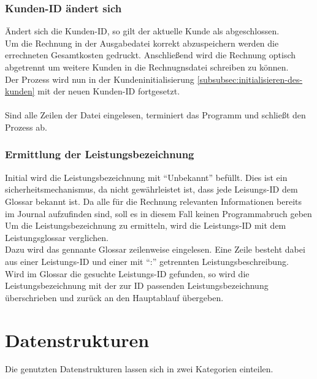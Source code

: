 \subsubsection{Kunden-ID ändert sich}\label{subsubsec:kunden-id-aendert-sich}
Ändert sich die Kunden-ID, so gilt der aktuelle Kunde als abgeschlossen.\\
Um die Rechnung in der Ausgabedatei korrekt abzuspeichern werden die errechneten Gesamtkosten gedruckt. Anschließend wird die Rechnung optisch abgetrennt um weitere Kunden in die Rechnugnsdatei schreiben zu können.\\
Der Prozess wird nun in der Kundeninitialisierung \ref{subsubsec:initialisieren-des-kunden} mit der neuen Kunden-ID fortgesetzt.\\
\\

Sind alle Zeilen der Datei eingelesen, terminiert das Programm und schließt den Prozess ab.\\

\subsubsection{Ermittlung der Leistungsbezeichnung}\label{subsubsec:ermittlung-der-leistungsbezeichnung}
Initial wird die Leistungsbezeichnung mit \enquote{Unbekannt} befüllt. Dies ist ein sicherheitsmechanismus, da nicht gewährleistet ist, dass jede Leisungs-ID dem Glossar bekannt ist. Da alle für die Rechnung relevanten Informationen bereits im Journal aufzufinden sind, soll es in diesem Fall keinen Programmabruch geben\\
Um die Leistungsbezeichnung zu ermitteln, wird die Leistungs-ID mit dem Leistungsglossar verglichen.\\
Dazu wird das gennante Glossar zeilenweise eingelesen. Eine Zeile besteht dabei aus einer Leistungs-ID und einer mit \enquote{:} getrennten Leistungsbeschreibung.\\
Wird im Glossar die gesuchte Leistungs-ID gefunden, so wird die Leistungsbezeichnung mit der zur ID passenden Leistungsbezeichnung überschrieben und zurück an den Hauptablauf übergeben.\\

\section{Datenstrukturen}\label{subsec:datenstrukt}
Die genutzten Datenstrukturen lassen sich in zwei Kategorien einteilen.\\

